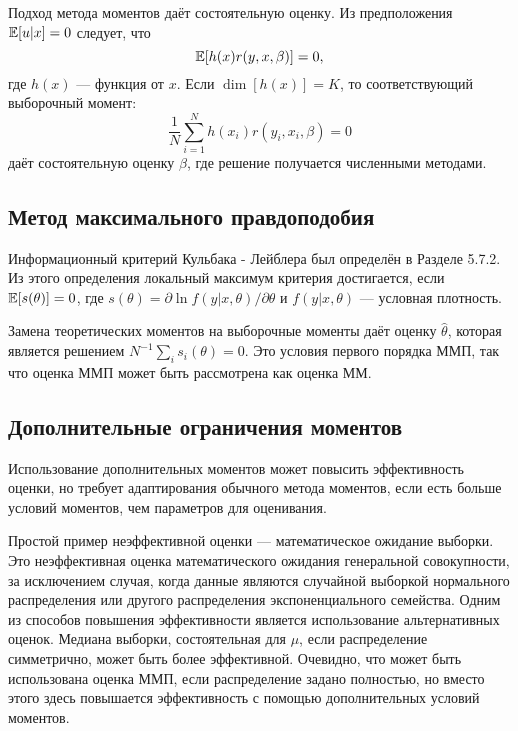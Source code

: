 Подход метода моментов даёт состоятельную оценку. Из предположения $\mathbb{E}[u|x]=0$ следует, что
\[
\mathbb{E}[h(x)r(y,x,\beta)]=0,
\]
где $h(x)$ --- функция от $x$. Если $\dim[h(x)]=K$, то соответствующий выборочный момент: 
\[
\frac{1}{N} \sum_{i=1}^{N} h(x_i)r(y_i,x_i,\beta)=0
\]
даёт состоятельную оценку $\beta$, где решение получается численными методами.

\subsection{Метод максимального правдоподобия}

Информационный критерий Кульбака - Лейблера  был определён в Разделе 5.7.2. Из этого определения локальный максимум критерия достигается, если $\mathbb{E}[s(\theta)]=0$, где $s(\theta)= \partial \ln f(y|x,\theta) / \partial \theta$ и $f(y|x,\theta)$ --- условная плотность.

Замена теоретических моментов на выборочные моменты даёт оценку $\hat{\theta}$, которая является решением $N^{-1} \sum_i s_i(\theta)=0$. Это условия первого порядка ММП, так что оценка ММП может быть рассмотрена как оценка ММ.

\subsection{Дополнительные ограничения моментов}

Использование дополнительных моментов может повысить эффективность оценки, но требует адаптирования обычного метода моментов, если есть больше условий моментов, чем параметров для оценивания.

Простой пример неэффективной оценки ---  математическое ожидание выборки. Это неэффективная оценка математического ожидания генеральной совокупности, за исключением случая, когда данные являются случайной выборкой нормального распределения или другого распределения экспоненциального семейства. Одним из способов повышения эффективности является использование альтернативных оценок. Медиана выборки, состоятельная для $\mu$, если распределение симметрично, может быть более эффективной. Очевидно, что может быть использована оценка ММП, если распределение задано полностью, но вместо этого здесь повышается эффективность с помощью дополнительных условий моментов.


